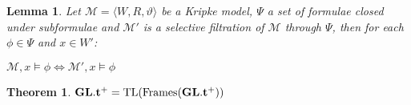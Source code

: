 \documentclass[a4paper]{article}
\theoremstyle{defin}
\theoremstyle{theorem}
\newtheorem{theorem}{Theorem}
\theoremstyle{prop}
\theoremstyle{lemma}
\newtheorem{lemma}{Lemma}
\theoremstyle{ex}
\theoremstyle{col}
\begin{document}
\begin{lemma}
  Let $\mathcal{M} = \langle W, R, \vartheta \rangle$ be a Kripke model, $\Psi$ a set of formulae closed under subformulae and $\mathcal{M}'$ is a selective filtration of $\mathcal{M}$ through $\Psi$, then for each $\phi \in \Psi$ and $x \in W'$:

  \begin{center}
    $\mathcal{M}, x \models \phi \Leftrightarrow \mathcal{M}', x \models \phi$
  \end{center}
\end{lemma}

\begin{theorem}
  ${\bf GL}.{\bf t}^{+} = \operatorname{TL}(\operatorname{Frames}({\bf GL}.{\bf t}^{+}))$
\end{theorem}
\end{document}
